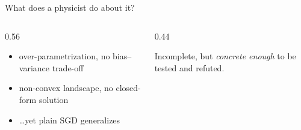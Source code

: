 \documentclass[aspectratio=169,11pt]{beamer}
\begin{document}
\begin{frame}{What does a physicist do about it?}
  \begin{columns}[T]
    \begin{column}{0.56\textwidth}
      \begin{itemize}
        \setlength{\itemsep}{0.2em}
        \item over-parametrization, no bias--variance trade-off
        \item non-convex landscape, no closed-form solution
        \item \dots yet plain SGD generalizes
      \end{itemize}
    \end{column}
    \pause
    \begin{column}{0.44\textwidth}
      \par\vspace{0.2em}
      \small Incomplete, but \emph{concrete enough} to be tested and refuted.
    \end{column}
  \end{columns}
  \centerline{\resizebox{0.48\textwidth}{!}{\atomprogression}}
  \vspace{1.5em}
  \pause
  \vspace{0.15em}

\end{frame}
\end{document}
